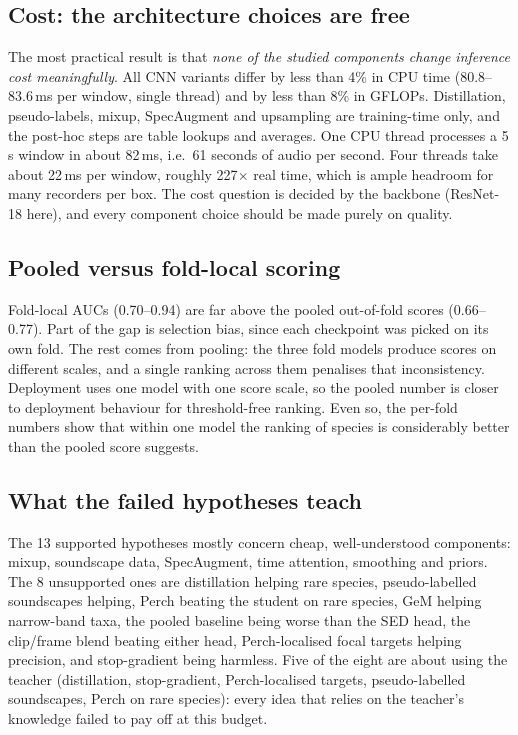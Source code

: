 \documentclass[11pt]{article}
\begin{document}
\subsection{Cost: the architecture choices are free}
The most practical result is that \emph{none of the studied components change
inference cost meaningfully}. All CNN variants differ by less than 4\% in CPU
time (80.8--83.6\,ms per window, single thread) and by less than 8\% in
GFLOPs. Distillation, pseudo-labels, mixup, SpecAugment and upsampling are
training-time only, and the post-hoc steps are table lookups and averages.
One CPU thread processes a 5\,s window in about 82\,ms, i.e.\ 61 seconds of
audio per second. Four threads take about 22\,ms per window, roughly
227$\times$ real time, which is ample headroom for many recorders per box. The
cost question is decided by the backbone (ResNet-18 here), and every component
choice should be made purely on quality.

\subsection{Pooled versus fold-local scoring}
Fold-local AUCs (0.70--0.94) are far above the pooled out-of-fold scores
(0.66--0.77). Part of the gap is selection bias, since each checkpoint was
picked on its own fold. The rest comes from pooling: the three fold models
produce scores on different scales, and a single ranking across them
penalises that inconsistency. Deployment uses one model with one score scale,
so the pooled number is closer to deployment behaviour for threshold-free
ranking. Even so, the per-fold numbers show that within one model the ranking
of species is considerably better than the pooled score suggests.

\subsection{What the failed hypotheses teach}
The 13 supported hypotheses mostly concern cheap, well-understood components:
mixup, soundscape data, SpecAugment, time attention, smoothing and priors. The
8 unsupported ones are distillation helping
rare species, pseudo-labelled soundscapes helping, Perch beating the student
on rare species, GeM helping narrow-band taxa, the pooled baseline being worse
than the SED head, the clip/frame blend beating either head, Perch-localised
focal targets helping precision, and stop-gradient being harmless. Five of the eight are about using the
teacher (distillation, stop-gradient, Perch-localised targets, pseudo-labelled
soundscapes, Perch on rare species): every idea that relies on the teacher's
knowledge failed to pay off at this budget.
\end{document}
